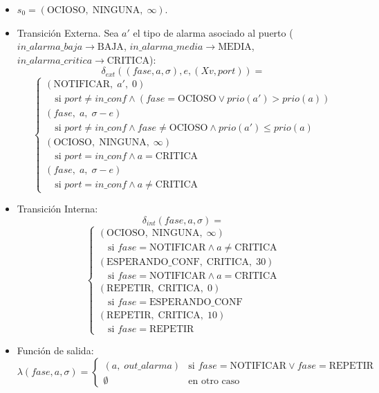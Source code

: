 \begin{itemize}
    \item $s_0 = (\text{OCIOSO},\; \text{NINGUNA},\; \infty)$.

    \item Transición Externa. Sea $a'$ el tipo de alarma asociado al puerto
    ($in\_alarma\_baja \to \text{BAJA}$, $in\_alarma\_media \to \text{MEDIA}$,
    $in\_alarma\_critica \to \text{CRITICA}$):
    \[
    \delta_{ext}((fase, a, \sigma), e, (Xv, port)) =
    \]
    \[
    \begin{cases}
    (\text{NOTIFICAR},\; a',\; 0) \\
    \quad \text{si } port \neq in\_conf \land
          (fase = \text{OCIOSO} \lor prio(a') > prio(a)) \\[2ex]
    (fase,\; a,\; \sigma - e) \\
    \quad \text{si } port \neq in\_conf \land
          fase \neq \text{OCIOSO} \land prio(a') \leq prio(a) \\[2ex]
    (\text{OCIOSO},\; \text{NINGUNA},\; \infty) \\
    \quad \text{si } port = in\_conf \land a = \text{CRITICA} \\[2ex]
    (fase,\; a,\; \sigma - e) \\
    \quad \text{si } port = in\_conf \land a \neq \text{CRITICA}
    \end{cases}
    \]

    \item Transición Interna:
    \[
    \delta_{int}(fase, a, \sigma) =
    \]
    \[
    \begin{cases}
    (\text{OCIOSO},\; \text{NINGUNA},\; \infty) \\
    \quad \text{si } fase = \text{NOTIFICAR} \land a \neq \text{CRITICA} \\[2ex]
    (\text{ESPERANDO\_CONF},\; \text{CRITICA},\; 30) \\
    \quad \text{si } fase = \text{NOTIFICAR} \land a = \text{CRITICA} \\[2ex]
    (\text{REPETIR},\; \text{CRITICA},\; 0) \\
    \quad \text{si } fase = \text{ESPERANDO\_CONF} \\[2ex]
    (\text{REPETIR},\; \text{CRITICA},\; 10) \\
    \quad \text{si } fase = \text{REPETIR}
    \end{cases}
    \]

    \item Función de salida:
    \[
    \lambda(fase, a, \sigma) =
    \begin{cases}
    (a,\; out\_alarma) & \text{si } fase = \text{NOTIFICAR} \lor fase = \text{REPETIR} \\
    \emptyset & \text{en otro caso}
    \end{cases}
    \]


\end{itemize}
